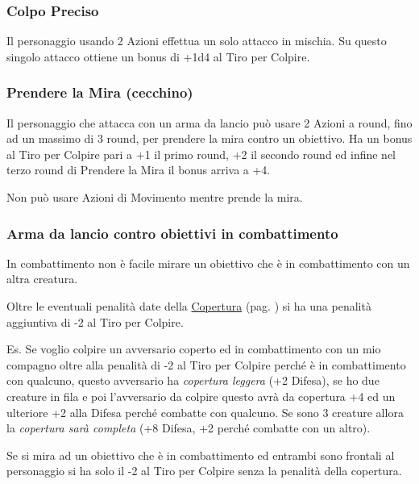 \begin{multicols}{2}
\subsubsection{Colpo Preciso} \label{colpopreciso}\hypertarget{colpopreciso}{}

Il personaggio usando 2 Azioni effettua un solo attacco in mischia. Su questo singolo attacco ottiene un bonus di +1d4 al Tiro per Colpire.

\subsubsection{Prendere la Mira (cecchino)} \label{cecchino}\hypertarget{cecchino}{}

Il personaggio che attacca con un arma da lancio può usare 2 Azioni a round, fino ad un massimo di 3 round, per prendere la mira contro un obiettivo. Ha un bonus al Tiro per Colpire pari a +1 il primo round, +2 il secondo round ed infine nel terzo round di Prendere la Mira il bonus arriva a +4.

Non può usare Azioni di Movimento mentre prende la mira.

\subsubsection{Arma da lancio contro obiettivi in combattimento} \label{usarearmalancioinmischia}

In combattimento non è facile mirare un obiettivo che è in combattimento con un altra creatura.

Oltre le eventuali penalità date della \hyperlink{esempicopertura}{Copertura} (pag. \pageref{esempicopertura}) si ha una penalità aggiuntiva di -2 al Tiro per Colpire.

Es. Se voglio colpire un avversario coperto ed in combattimento con un mio compagno oltre alla penalità di -2 al Tiro per Colpire perché è in combattimento con qualcuno, questo avversario ha \emph{copertura leggera} (+2 Difesa), se ho due creature in fila e poi l'avversario da colpire questo avrà da copertura +4 ed un ulteriore +2 alla Difesa perché combatte con qualcuno.
Se sono 3 creature allora la \emph{copertura sarà completa} (+8 Difesa, +2 perché combatte con un altro).

Se si mira ad un obiettivo che è in combattimento ed entrambi sono frontali al personaggio si ha solo il -2 al Tiro per Colpire senza la penalità della copertura.


\end{multicols}
